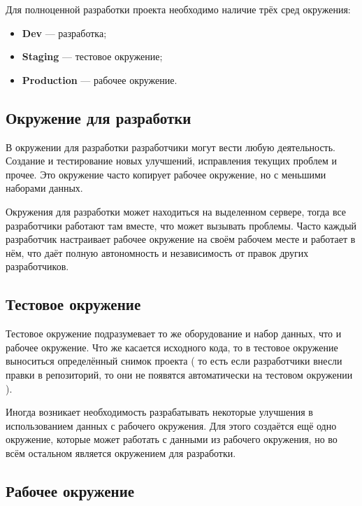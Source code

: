 Для полноценной разработки проекта необходимо наличие трёх сред окружения:
\begin{itemize}

\item \textbf{Dev} --- разработка;

\item \textbf{Staging} --- тестовое окружение;

\item \textbf{Production} --- рабочее окружение.

\end{itemize}


\subsection{ Окружение для разработки } \label{sect2_9_1}

В окружении для разработки разработчики могут вести любую деятельность. Создание и тестирование новых улучшений, исправления текущих проблем и прочее. Это окружение часто копирует рабочее окружение, но с меньшими наборами данных.

Окружения для разработки может находиться на выделенном сервере, тогда все разработчики работают там вместе, что может вызывать проблемы. Часто каждый разработчик настраивает рабочее окружение на своём рабочем месте и работает в нём, что даёт полную автономность и независимость от правок других разработчиков.


\subsection{ Тестовое окружение } \label{sect2_9_2}

Тестовое окружение подразумевает то же оборудование и набор данных, что и рабочее окружение. Что же касается исходного кода, то в тестовое окружение выноситься определённый снимок проекта ( то есть если разработчики внесли правки в репозиторий, то они не появятся автоматически на тестовом окружении ).

Иногда возникает необходимость  разрабатывать некоторые улучшения в использованием данных с рабочего окружения. Для этого создаётся ещё одно окружение, которые может работать с данными из рабочего окружения, но во всём остальном является окружением для разработки.

\subsection{ Рабочее окружение } \label{sect2_9_3}

